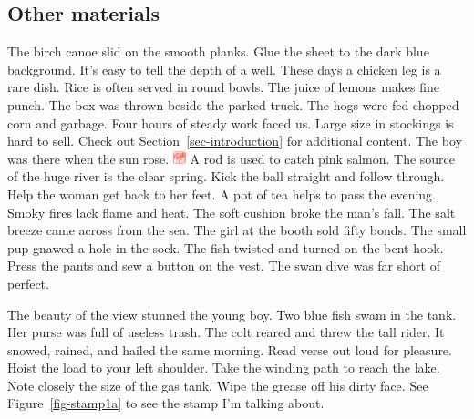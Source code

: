 \documentclass[
  letterpaper,
  DIV=11,
  numbers=noendperiod]{scrartcl}
\begin{document}
\newpage{}

\hypertarget{other-materials}{%
\subsection{Other materials}\label{other-materials}}

The birch canoe slid on the smooth planks. Glue the sheet to the dark
blue background. It's easy to tell the depth of a well. These days a
chicken leg is a rare dish. Rice is often served in round bowls. The
juice of lemons makes fine punch. The box was thrown beside the parked
truck. The hogs were fed chopped corn and garbage. Four hours of steady
work faced us. Large size in stockings is hard to sell. Check out
Section~\ref{sec-introduction} for additional content. The boy was there
when the sun rose.
\includegraphics[width=\textwidth,height=1em]{stamp1a.jpg} A rod is used
to catch pink salmon. The source of the huge river is the clear spring.
Kick the ball straight and follow through. Help the woman get back to
her feet. A pot of tea helps to pass the evening. Smoky fires lack flame
and heat. The soft cushion broke the man's fall. The salt breeze came
across from the sea. The girl at the booth sold fifty bonds. The small
pup gnawed a hole in the sock. The fish twisted and turned on the bent
hook. Press the pants and sew a button on the vest. The swan dive was
far short of perfect.

The beauty of the view stunned the young boy. Two blue fish swam in the
tank. Her purse was full of useless trash. The colt reared and threw the
tall rider. It snowed, rained, and hailed the same morning. Read verse
out loud for pleasure. Hoist the load to your left shoulder. Take the
winding path to reach the lake. Note closely the size of the gas tank.
Wipe the grease off his dirty face. See Figure~\ref{fig-stamp1a} to see
the stamp I'm talking about.
\end{document}
